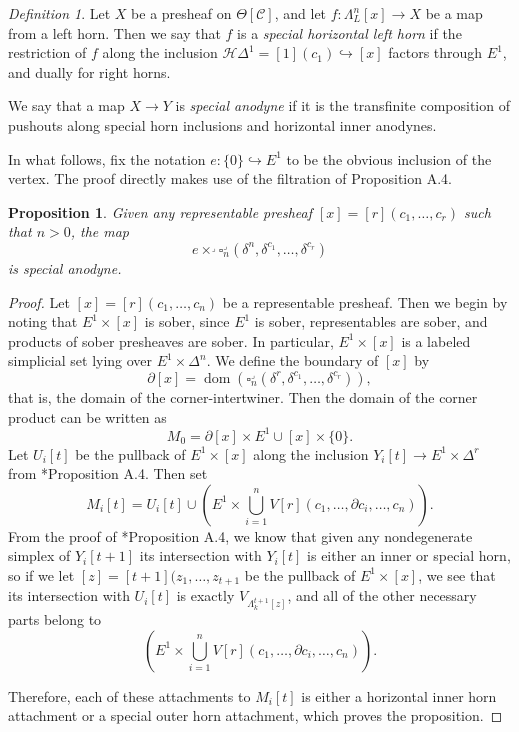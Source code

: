 \documentclass{amsart}
\numberwithin{equation}{section}
\theoremstyle{plain}   %
\newtheorem{prop}[subsection]{Proposition}
\theoremstyle{remark}
\newtheorem{defn}[subsection]{Definition}
\theoremstyle{plain}
\newcommand{\C}{\ensuremath{\mathcal{C}}}
\begin{document}
\begin{defn}
	Let \(X\) be a presheaf on \(\Theta[\C]\), and let \(f:\Lambda^n_L[x]\to X\) be a map from a left horn.  Then we say that \(f\) is a \emph{special horizontal left horn} if the restriction of \(f\) along the inclusion \(\mathscr{H}\Delta^1=[1](c_1)\hookrightarrow [x]\) factors through \(E^1\), and dually for right horns.

	We say that a map \(X\to Y\) is \emph{special anodyne} if it is the transfinite composition of pushouts along special horn inclusions and horizontal inner anodynes.
\end{defn}

In what follows, fix the notation \(e:\{0\}\hookrightarrow E^1\) to be the obvious inclusion of the vertex.  The proof directly makes use of the filtration of \cite{ds2}{Proposition A.4}.

\begin{prop} Given any representable presheaf \([x]=[r](c_1,\dots,c_r)\) such that \(n>0\), the map
	\[e \times^\lrcorner \square^\lrcorner_n(\delta^n,\delta^{c_1},\dots,\delta^{c_r})\]
	is special anodyne.
\end{prop}
\begin{proof}
	Let \([x]=[r](c_1,\dots,c_n)\) be a representable presheaf.  Then we begin by noting that \(E^1\times [x]\) is sober, since \(E^1\) is sober, representables are sober, and products of sober presheaves are sober. In particular, \(E^1\times [x]\) is a labeled simplicial set lying over \(E^1\times \Delta^n\).  We define the boundary of \([x]\) by \[\partial[x] = \operatorname{dom}\left(\square^\lrcorner_n(\delta^r, \delta^{c_1},\dots, \delta^{c_r})\right),\] that is, the domain of the corner-intertwiner.  Then the domain of the corner product can be written as \[M_0=\partial[x] \times E^1 \cup [x]\times \{0\}.\]  Let \(U_i[t]\) be the pullback of \(E^1\times [x]\) along the inclusion \(Y_i[t]\to E^1\times \Delta^r\) from \cite{ds2}*{Proposition A.4}.  Then set \[M_i[t]=U_i[t]\cup \left(E^1 \times \bigcup_{i=1}^n V[r](c_1,\dots,\partial c_i, \dots, c_n) \right).\] From the proof of \cite{ds1}*{Proposition A.4}, we know that given any nondegenerate simplex of \(Y_i[t+1]\) its intersection with \(Y_i[t]\) is either an inner or special horn, so if we let \([z]=[t+1](z_1,\dots,z_{t+1}\) be the pullback of \(E^1\times [x]\), we see that its intersection with \(U_i[t]\) is exactly \(V_{\Lambda^{t+1}_k[z]}\), and all of the other necessary parts belong to \[\left(E^1 \times \bigcup_{i=1}^n V[r](c_1,\dots,\partial c_i, \dots, c_n) \right).\]

	Therefore, each of these attachments to \(M_i[t]\) is either a horizontal inner horn attachment or a special outer horn attachment, which proves the proposition.
\end{proof}
\end{document}
